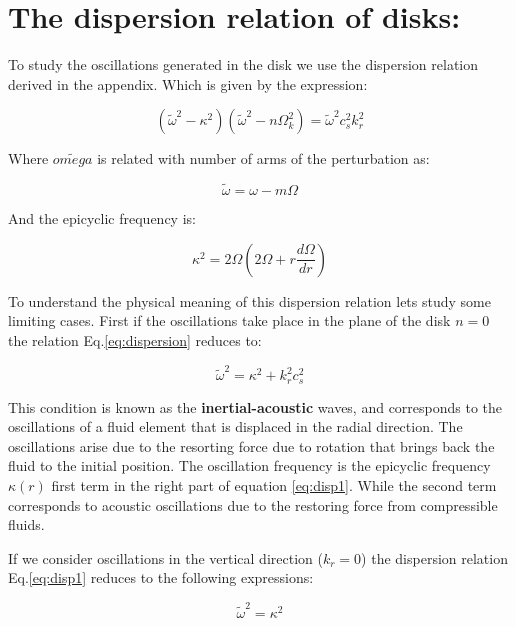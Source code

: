 \section*{The dispersion relation of disks:}

To study the oscillations generated in the disk
we use the dispersion relation derived in the appendix.
Which is given by the expression:

\begin{equation}\label{eq:dispersion}
(\tilde{\omega}^2 - \kappa^2)(\tilde{\omega}^2 - n\Omega_k^2) =
\tilde{\omega}^2 c_s^2 k_r^2
\end{equation}

Where $\tilde{omega}$ is related with number of arms of the
perturbation as:

\begin{equation}
\tilde{\omega} = \omega - m\Omega
\end{equation}

And the epicyclic frequency is:

\begin{equation}
\kappa^2 = 2\Omega \left( 2\Omega + r \dfrac{d\Omega}{dr}  \right)
\end{equation}

To understand the physical meaning of this dispersion relation lets
study some limiting cases. First if the oscillations take place in 
the plane of the disk $n=0$ the relation Eq.\ref{eq:dispersion}
reduces to:

\begin{equation}\label{eq:disp1}
\tilde{\omega}^2 = \kappa^2 + k_r^2 c_s^2
\end{equation}

This condition is known as the \textbf{inertial-acoustic} waves,
and corresponds to the oscillations of a fluid element that is
displaced in the radial direction. The oscillations arise due to the
resorting force due to rotation that brings back the fluid to the
initial position.
The oscillation frequency is the epicyclic frequency $\kappa(r)$ first
term in the right part of equation \ref{eq:disp1}. While the second
term corresponds to acoustic oscillations due to the restoring force
from compressible fluids.

If we consider oscillations in the vertical direction ($k_r=0$) the
dispersion relation Eq.\ref{eq:disp1} reduces to the following
expressions:

\begin{equation}
\tilde{\omega}^2 = \kappa^2
\end{equation}

